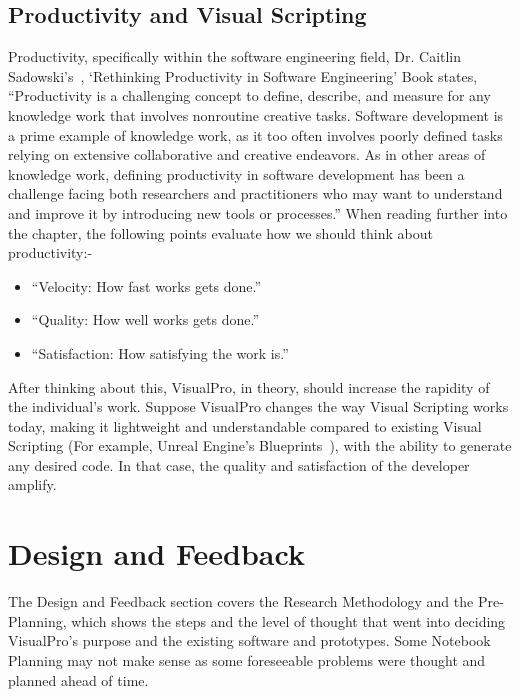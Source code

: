 \documentclass[conference]{IEEEtran}
\begin{document}
      \subsection{Productivity and Visual Scripting}
      Productivity, specifically within the software engineering field, Dr. Caitlin Sadowski's~\cite{dr_caitlin_sadowski_rethinking_2019}, `Rethinking Productivity in Software Engineering' Book states, ``Productivity is a challenging concept to define, describe, and measure for any knowledge work that involves nonroutine creative tasks. Software development is a prime example of knowledge work, as it too often involves poorly defined tasks relying on extensive collaborative and creative endeavors. As in other areas of knowledge work, defining productivity in software development has been a challenge facing both researchers and practitioners who may want to understand and improve it by introducing new tools or processes.'' When reading further into the chapter, the following points evaluate how we should think about productivity:-

      \begin{itemize}
        \item ``Velocity: How fast works gets done.''
        \item ``Quality: How well works gets done.''
        \item ``Satisfaction: How satisfying the work is.''
      \end{itemize}

      After thinking about this, VisualPro, in theory, should increase the rapidity of the individual’s work. Suppose VisualPro changes the way Visual Scripting works today, making it lightweight and understandable compared to existing Visual Scripting (For example, Unreal Engine's Blueprints~\cite{unreal_engine_introduction_nodate}), with the ability to generate any desired code. In that case, the quality and satisfaction of the developer amplify.

    \section{Design and Feedback}
    \label{sec:designAndFeedback}
      The Design and Feedback section covers the Research Methodology and the Pre-Planning, which shows the steps and the level of thought that went into deciding VisualPro's purpose and the existing software and prototypes. Some Notebook Planning may not make sense as some foreseeable problems were thought and planned ahead of time.
\end{document}
